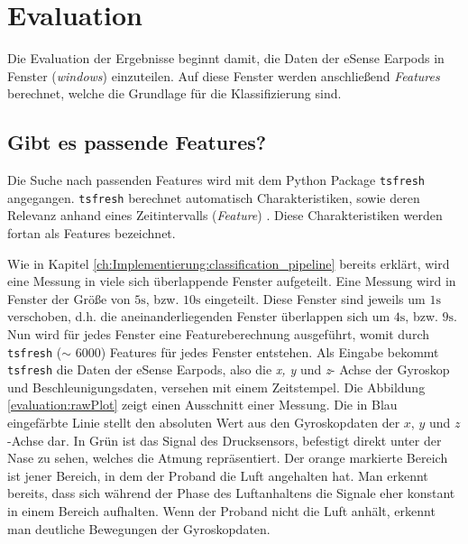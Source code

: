 
\chapter{Evaluation}
\label{ch:Evaluation}
Die Evaluation der Ergebnisse beginnt damit, die Daten der eSense Earpods in Fenster (\textit{windows}) einzuteilen.
Auf diese Fenster werden anschließend \textit{Features} berechnet, welche die Grundlage für die Klassifizierung sind.

\section{Gibt es passende Features?}
Die Suche nach passenden Features wird mit dem Python Package \texttt{tsfresh} angegangen.
\texttt{tsfresh} berechnet automatisch Charakteristiken, sowie deren Relevanz anhand eines Zeitintervalls (\textit{Feature}) \cite{TsfreshTsfresh12}.
Diese Charakteristiken werden fortan als Features bezeichnet.

Wie in Kapitel \ref{ch:Implementierung:classification_pipeline} bereits erklärt, wird eine Messung in viele sich überlappende Fenster aufgeteilt. 
Eine Messung wird in Fenster der Größe von $5\si{\s}$, bzw. $10\si{\s}$ eingeteilt.
Diese Fenster sind jeweils um $1\si{\s}$ verschoben, d.h. die aneinanderliegenden Fenster überlappen sich um $4\si{\s}$, bzw. $9\si{\s}$.
Nun wird für jedes Fenster eine Featureberechnung ausgeführt, womit durch \texttt{tsfresh} ($\sim$ 6000) Features für jedes Fenster entstehen.
Als Eingabe bekommt \texttt{tsfresh} die Daten der eSense Earpods, also die \textit{x, y} und \textit{z}- Achse der Gyroskop und Beschleunigungsdaten, versehen mit einem Zeitstempel. 
Die Abbildung \ref{evaluation:rawPlot} zeigt einen Ausschnitt einer Messung. 
Die in Blau eingefärbte Linie stellt den absoluten Wert aus den Gyroskopdaten der $x$, $y$ und $z$-Achse dar.
In Grün ist das Signal des Drucksensors, befestigt direkt unter der Nase zu sehen, welches die Atmung repräsentiert.
Der orange markierte Bereich ist jener Bereich, in dem der Proband die Luft angehalten hat. 
Man erkennt bereits, dass sich während der Phase des Luftanhaltens die Signale eher konstant in einem Bereich aufhalten.
Wenn der Proband nicht die Luft anhält, erkennt man deutliche Bewegungen der Gyroskopdaten. 

